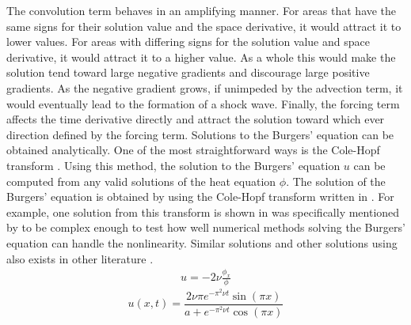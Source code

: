 The convolution term behaves in an amplifying manner. For areas that have the same signs for their solution value and the space derivative, it would attract it to lower values. For areas with differing signs for the solution value and space derivative, it would attract it to a higher value. As a whole this would make the solution tend toward large negative gradients and discourage large positive gradients. As the negative gradient grows, if unimpeded by the advection term, it would eventually lead to the formation of a shock wave. Finally, the forcing term affects the time derivative directly and attract the solution toward which ever direction defined by the forcing term. %
Solutions to the Burgers' equation can be obtained analytically. One of the most straightforward ways is the Cole-Hopf transform \autocite{wazwazPartialDifferentialEquations2010}. Using this method, the solution to the Burgers' equation \(u\) can be computed from any valid solutions of the heat equation \(\phi \). The solution of the Burgers' equation is obtained by using the Cole-Hopf transform written in . For example, one solution from this transform is shown in  was specifically mentioned by \textcite{woodExactSolutionBurgers2006} to be complex enough to test how well numerical methods solving the Burgers' equation can handle the nonlinearity. Similar solutions and other solutions using also exists in other literature \autocite{bentonTableSolutionsOnedimensional1972,wazwazPartialDifferentialEquations2010}.
\begin{align}
  u = -2\nu\frac{\phi_x}{\phi}\label{eq:cole_hopf}
\end{align}
\begin{equation}
  u(x,t) = \frac{2\nu\pi e^{-\pi^2\nu t}\sin(\pi x)}{a+e^{-\pi^2\nu t}\cos(\pi x)} \label{eq:burgers_exact_solution}
\end{equation}

